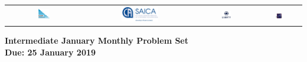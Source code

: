 \documentclass{article}
\begin{document}
\setlength{\tabcolsep}{0.015\textwidth}
\begin{center} \begin{tabular}{cccc}
	\includegraphics[width=0.16\textwidth]{SAMF_logo.jpg} &
	\includegraphics[width=0.35\textwidth]{SAICA_logo.jpg} &
	\includegraphics[width=0.18\textwidth]{Liberty_logo.jpg} &
	\includegraphics[width=0.18\textwidth]{SAMO2019.png}
\end{tabular} \end{center}


\vspace{30pt}

\begin{center}
\textbf{\Large Intermediate January Monthly Problem Set}
\\ \vspace{1em}
\textbf{\large Due: 25 January 2019}
\end{center}

\vspace{12pt}
\end{document}
